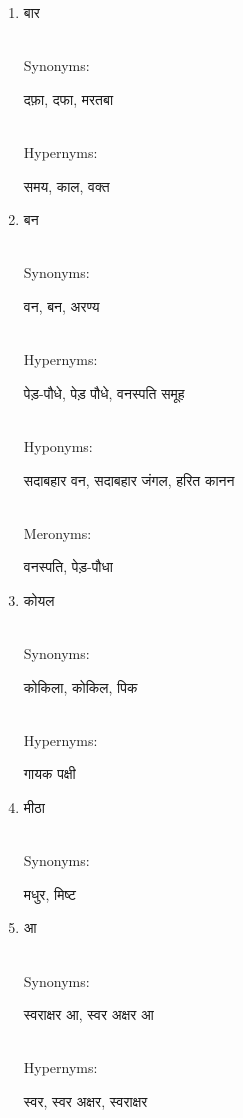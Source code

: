 \documentclass{article}
\begin{document}
\begin{enumerate}

\item \begin{hindi}बार\end{hindi} \\
Synonyms: \begin{hindi}दफ़ा, दफा, मरतबा\end{hindi} \\
Hypernyms: \begin{hindi}समय, काल, वक्त\end{hindi}

\item \begin{hindi}बन\end{hindi} \\
Synonyms: \begin{hindi}वन, बन, अरण्य\end{hindi} \\
Hypernyms: \begin{hindi}पेड़-पौधे, पेड़ पौधे, वनस्पति समूह\end{hindi} \\
Hyponyms: \begin{hindi}सदाबहार वन, सदाबहार जंगल, हरित कानन\end{hindi} \\
Meronyms: \begin{hindi}वनस्पति, पेड़-पौधा\end{hindi}

\item \begin{hindi}कोयल\end{hindi} \\
Synonyms: \begin{hindi}कोकिला, कोकिल, पिक\end{hindi} \\
Hypernyms: \begin{hindi}गायक पक्षी\end{hindi}

\item \begin{hindi}मीठा\end{hindi} \\
Synonyms: \begin{hindi}मधुर, मिष्ट\end{hindi}

\item \begin{hindi}आ\end{hindi} \\
Synonyms: \begin{hindi}स्वराक्षर आ, स्वर अक्षर आ\end{hindi} \\
Hypernyms: \begin{hindi}स्वर, स्वर अक्षर, स्वराक्षर\end{hindi}


\end{enumerate}
\end{document}
